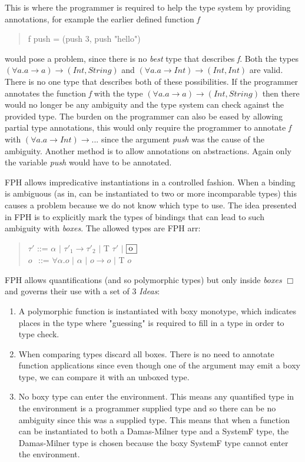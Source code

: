 \documentclass[twoside, titlepage, openright, a4paper]{book}
\begin{document}
This is where the programmer is required to help the type system by providing annotations, for example the earlier defined function \emph{f}
\begin{quotation}
f push = (push 3, push "hello")
\end{quotation}
would pose a problem, since there is no \emph{best} type that describes \emph{f}. Both the types $(\forall a. a \rightarrow a) \rightarrow (Int, String)$ and $(\forall a. a \rightarrow Int) \rightarrow (Int, Int)$ are valid. There is no one type that describes both of these possibilities.
If the programmer annotates the function \emph{f} with the type $(\forall a. a \rightarrow a) \rightarrow (Int, String)$ then there would no longer be any ambiguity and the type system can check against the provided type.
The burden on the programmer can also be eased by allowing partial type annotations, this would only require the programmer to annotate \emph{f} with $(\forall a. a \rightarrow Int) \rightarrow ...$ since the argument \emph{push} was the cause of the ambiguity. Another method is to allow annotations on abstractions. Again only the variable \emph{push} would have to be annotated.

FPH allows impredicative instantiations in a controlled fashion. When a binding is ambiguous (as in, can be instantiated to two or more incomparable types) this causes a problem because we do not know which type to use. The idea presented in FPH is to explicitly mark the types of bindings that can lead to such ambiguity with \textit{boxes}. The allowed types are FPH arr:

\begin{quotation}
$\tau'$ ::= $\alpha$ $|$  $\tau'_1 \rightarrow \tau'_2$ $|$ T $\tau'$ $|$ $\framebox[0.45cm][l]{o}$ \\
\indent $o$ $\hspace{1pt}$ ::= $\forall \alpha.o$ $|$ $\alpha$ $|$ $o \rightarrow o$ $|$ T $o$
\end{quotation}

FPH allows quantifications (and so polymorphic types) but only inside \emph{boxes} $\Box$ and governs their use with a set of 3 \textit{Ideas}\cite{FPH}:

\begin{enumerate}
\item A polymorphic function is instantiated with boxy monotype, which indicates places in the type where "guessing" is required to fill in a type in order to type check.
\item When comparing types discard all boxes. There is no need to annotate function applications since even though one of the argument may emit a boxy type, we can compare it with an unboxed type.
\item No boxy type can enter the environment. This means any quantified type in the environment is a programmer supplied type and so there can be no ambiguity since this was a supplied type. This means that when a function can be instantiated to both a Damas-Milner type and a SystemF type, the Damas-Milner type is chosen because the boxy SystemF type cannot enter the environment.
\end{enumerate}
\end{document}
